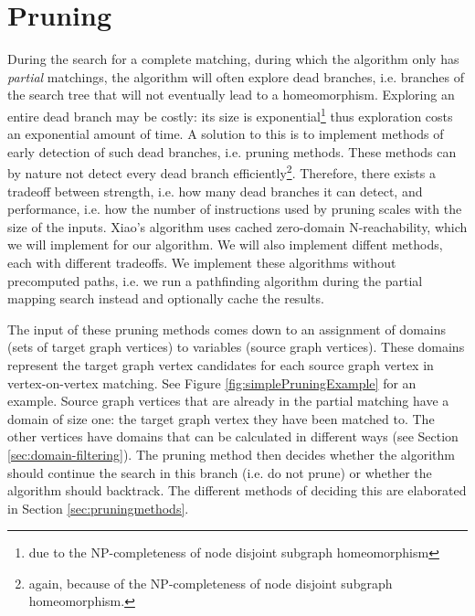 \chapter{Pruning}
\label{chapter:pruning}

During the search for a complete matching, during which the algorithm only has \textit{partial} matchings, the algorithm will often explore dead branches, i.e. branches of the search tree that will not eventually lead to a homeomorphism. Exploring an entire dead branch may be costly: its size is exponential\footnote{due to the NP-completeness of node disjoint subgraph homeomorphism} thus exploration costs an exponential amount of time. A solution to this is to implement methods of early detection of such dead branches, i.e. pruning methods. These methods can by nature not detect every dead branch efficiently\footnote{again, because of the NP-completeness of node disjoint subgraph homeomorphism.}. Therefore, there exists a tradeoff between strength, i.e. how many dead branches it can detect, and performance, i.e. how the number of instructions used by pruning scales with the size of the inputs. Xiao's algorithm uses cached zero-domain N-reachability, which we will implement for our algorithm. We will also implement diffent methods, each with different tradeoffs. We implement these algorithms without precomputed paths, i.e. we run a pathfinding algorithm during the partial mapping search instead and optionally cache the results.

The input of these pruning methods comes down to an assignment of domains (sets of target graph vertices) to variables (source graph vertices). These domains represent the target graph vertex candidates for each source graph vertex in vertex-on-vertex matching. See Figure \ref{fig:simplePruningExample} for an example. Source graph vertices that are already in the partial matching have a domain of size one: the target graph vertex they have been matched to. The other vertices have domains that can be calculated in different ways (see Section \ref{sec:domain-filtering}). The pruning method then decides whether the algorithm should continue the search in this branch (i.e. do not prune) or whether the algorithm should backtrack. The different methods of deciding this are elaborated in Section \ref{sec:pruningmethods}.

